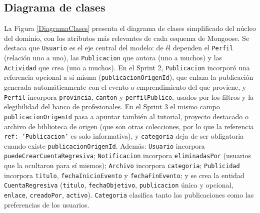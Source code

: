 \subsection{Diagrama de clases}
La Figura \ref{DiagramaClases} presenta el diagrama de clases simplificado del núcleo del dominio, con los atributos más relevantes de cada esquema de Mongoose. Se destaca que \texttt{Usuario} es el eje central del modelo: de él dependen el \texttt{Perfil} (relación uno a uno), las \texttt{Publicacion} que autora (uno a muchos) y las \texttt{Actividad} que crea (uno a muchos). En el Sprint 2, \texttt{Publicacion} incorporó una referencia opcional a sí misma (\texttt{publicacionOrigenId}), que enlaza la publicación generada automáticamente con el evento o emprendimiento del que proviene, y \texttt{Perfil} incorpora \texttt{provincia}, \texttt{canton} y \texttt{perfilPublico}, usados por los filtros y la elegibilidad del banco de profesionales. En el Sprint 3 el mismo campo \texttt{publicacionOrigenId} pasa a apuntar también al tutorial, proyecto destacado o archivo de biblioteca de origen (que son otras colecciones, por lo que la referencia \texttt{ref: 'Publicacion'} es solo informativa), y \texttt{categoria} deja de ser obligatoria cuando existe \texttt{publicacionOrigenId}. Además: \texttt{Usuario} incorpora \texttt{puedeCrearCuentaRegresiva}; \texttt{Notificacion} incorpora \texttt{eliminadasPor} (usuarios que la ocultaron para sí mismos); \texttt{Archivo} incorpora \texttt{categoria}; \texttt{Publicidad} incorpora \texttt{titulo}, \texttt{fechaInicioEvento} y \texttt{fechaFinEvento}; y se crea la entidad \texttt{CuentaRegresiva} (\texttt{titulo}, \texttt{fechaObjetivo}, \texttt{publicacion} única y opcional, \texttt{enlace}, \texttt{creadoPor}, \texttt{activo}). \texttt{Categoria} clasifica tanto las publicaciones como las preferencias de los usuarios.

